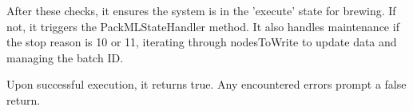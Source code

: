 After these checks, it ensures the system is in the 'execute' state for brewing. If not, it triggers the PackMLStateHandler method. It also handles maintenance if the stop reason is 10 or 11, iterating through nodesToWrite to update data and managing the batch ID.\newline

Upon successful execution, it returns true. Any encountered errors prompt a false return.\newline